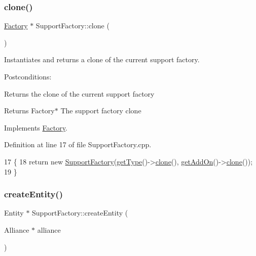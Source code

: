 \subsubsection{\texorpdfstring{clone()}{clone()}}
{\footnotesize\ttfamily \hyperlink{classFactory}{Factory} $\ast$ Support\+Factory\+::clone (\begin{DoxyParamCaption}{ }\end{DoxyParamCaption})\hspace{0.3cm}{\ttfamily [virtual]}}



Instantiates and returns a clone of the current support factory. 

Postconditions\+:
\begin{DoxyItemize}
\item Returns the clone of the current support factory
\end{DoxyItemize}

\begin{DoxyReturn}{Returns}
Factory$\ast$ The support factory clone 
\end{DoxyReturn}


Implements \hyperlink{classFactory_a00881ec5050751e4b747db5dfd266192}{Factory}.



Definition at line 17 of file Support\+Factory.\+cpp.


\begin{DoxyCode}
17                                \{
18     \textcolor{keywordflow}{return} \textcolor{keyword}{new} \hyperlink{classSupportFactory_a8e0b10fb625f7d4a93cec9989bef45c4}{SupportFactory}(\hyperlink{classFactory_ac91051006ace7ec5bb6ecf0fe6d02d58}{getType}()->\hyperlink{classSupportFactory_a802c25e901b479656ea95a5678a1ad26}{clone}(), 
      \hyperlink{classFactory_a994153930f59cafb280e91d5b100b5aa}{getAddOn}()->\hyperlink{classSupportFactory_a802c25e901b479656ea95a5678a1ad26}{clone}());
19 \}
\end{DoxyCode}
\mbox{\label{classSupportFactory_ad2ebc8fdf1335e423a766fa0c5573cf8}} 
\subsubsection{\texorpdfstring{create\+Entity()}{createEntity()}}
{\footnotesize\ttfamily Entity $\ast$ Support\+Factory\+::create\+Entity (\begin{DoxyParamCaption}\item[{Alliance $\ast$}]{alliance }\end{DoxyParamCaption})\hspace{0.3cm}{\ttfamily [virtual]}}



